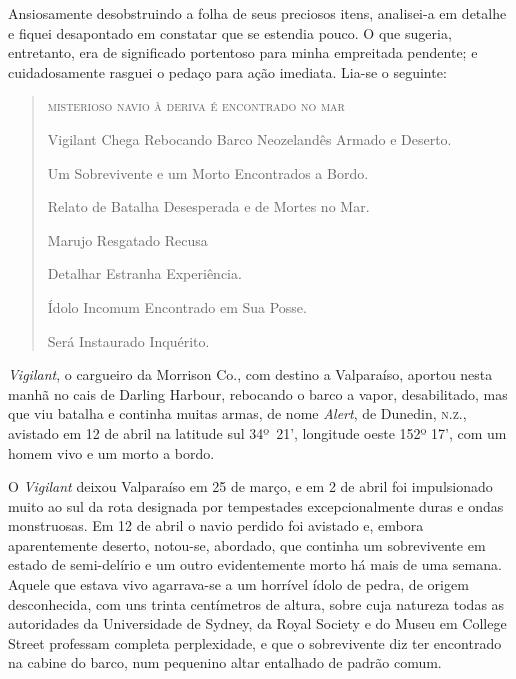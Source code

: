 \begin{pages}
\begin{Rightside}
Ansiosamente desobstruindo a folha de seus preciosos itens, analisei-a
em detalhe e fiquei desapontado em constatar que se estendia pouco. O
que sugeria, entretanto, era de significado portentoso para minha
empreitada pendente; e cuidadosamente rasguei o pedaço para ação
imediata. Lia-se o seguinte:

\begin{quote}
\textsc{misterioso navio à deriva é encontrado no mar}

Vigilant Chega Rebocando Barco Neozelandês Armado e Deserto.

Um Sobrevivente e um Morto Encontrados a Bordo.

Relato de Batalha Desesperada e de Mortes no Mar.

Marujo Resgatado Recusa

Detalhar Estranha Experiência.

Ídolo Incomum Encontrado em Sua Posse.

Será Instaurado Inquérito.
\end{quote}

\emph{Vigilant}, o cargueiro da Morrison Co., com destino a Valparaíso,
aportou nesta manhã no cais de Darling Harbour, rebocando o barco a
vapor, desabilitado, mas que viu batalha e continha muitas armas, de
nome \emph{Alert}, de Dunedin, \textsc{n.z.}, avistado em 12 de abril na latitude
sul 34º~21', longitude oeste 152º 17', com um homem vivo e um morto a bordo.

O \emph{Vigilant} deixou Valparaíso em 25 de março, e em 2 de abril foi
impulsionado muito ao sul da rota designada por tempestades
excepcionalmente duras e ondas monstruosas. Em 12 de abril o navio
perdido foi avistado e, embora aparentemente deserto, notou-se,
abordado, que continha um sobrevivente em estado de semi-delírio e um
outro evidentemente morto há mais de uma semana. Aquele que estava vivo
agarrava-se a um horrível ídolo de pedra, de origem desconhecida, com
uns trinta centímetros de altura, sobre cuja natureza todas as
autoridades da Universidade de Sydney, da Royal Society e do Museu em
College Street professam completa perplexidade, e que o sobrevivente diz
ter encontrado na cabine do barco, num pequenino altar entalhado de
padrão comum.


\end{Rightside}
\end{pages}
